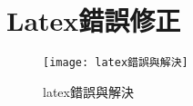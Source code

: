 \documentclass{report}
\begin{document}
\chapter{Latex錯誤修正}

\begin{figure}[!ht]
\centering
\texttt{[image: latex錯誤與解決]}
\caption{\Large latex錯誤與解決}
\label{fig:latex_error_solution}
\end{figure}
\end{document}
